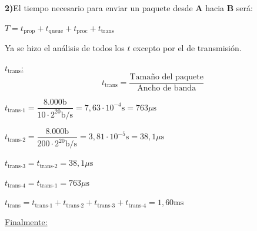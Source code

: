 \skipline
\noindent
\textbf{2)}\tab El tiempo necesario para enviar un paquete desde \textbf{A} hacia \textbf{B} será:

\vspace{0.5\baselineskip}
\hfil
{\large
$T =
t_{\text{prop}} + t_{\text{queue}} + t_{\text{proc}} + t_{\text{trans}}$
}
\hfil

\vspace{0.5\baselineskip}
Ya se hizo el análisis de todos los $t$ excepto por el de transmisión.


\skipline
{
\noindent\large
\underline{$t_{\text{trans}}$:}
}
$$t_{\text{trans}} = \dfrac{\text{Tamaño del paquete}}{\text{Ancho de banda}}$$

$t_{\text{trans-1}} =
\dfrac{8.000\text{b}}{10 \cdot 2^{20} \text{b}/\text{s}} =
7,63\cdot 10^{-4} \text{s} =
763 \mu\text{s}
$

\vspace{0.5\baselineskip}
$t_{\text{trans-2}} =
\dfrac{8.000\text{b}}{200 \cdot 2^{20} \text{b}/\text{s}} =
3,81\cdot 10^{-5} \text{s} =
38,1 \mu\text{s}
$

\vspace{0.5\baselineskip}
$t_{\text{trans-3}} =
t_{\text{trans-2}} =
38,1 \mu\text{s}
$

\vspace{0.5\baselineskip}
$t_{\text{trans-4}} =
t_{\text{trans-1}} =
763 \mu\text{s}
$

\vspace{\baselineskip}
$t_{\text{trans}} =
t_{\text{trans-1}} + t_{\text{trans-2}} + t_{\text{trans-3}} + t_{\text{trans-4}} = 1,60 \text{ms}
$

\skipline
\noindent
\underline{Finalmente:}

\vspace{0.5\baselineskip}
\hfil
{\large
{}
}
\hfil